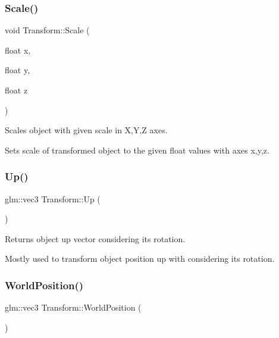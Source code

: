 \subsubsection{\texorpdfstring{Scale()}{Scale()}\hspace{0.1cm}{\footnotesize\ttfamily [3/3]}}
{\footnotesize\ttfamily void Transform\+::\+Scale (\begin{DoxyParamCaption}\item[{float}]{x,  }\item[{float}]{y,  }\item[{float}]{z }\end{DoxyParamCaption})\hspace{0.3cm}{\ttfamily [inline]}}



Scales object with given scale in X,Y,Z axes. 

Sets scale of transformed object to the given float values with axes x,y,z. \mbox{\label{class_transform_a647f01f73a5ad2d729080649bc477b76}} 
\subsubsection{\texorpdfstring{Up()}{Up()}}
{\footnotesize\ttfamily glm\+::vec3 Transform\+::\+Up (\begin{DoxyParamCaption}{ }\end{DoxyParamCaption})\hspace{0.3cm}{\ttfamily [inline]}}



Returns object up vector considering it\textquotesingle{}s rotation. 

Mostly used to transform object position up with considering it\textquotesingle{}s rotation. \mbox{\label{class_transform_a631ff0990e3297ed142ce6f5259c2c1a}} 
\subsubsection{\texorpdfstring{WorldPosition()}{WorldPosition()}}
{\footnotesize\ttfamily glm\+::vec3 Transform\+::\+World\+Position (\begin{DoxyParamCaption}{ }\end{DoxyParamCaption})}



